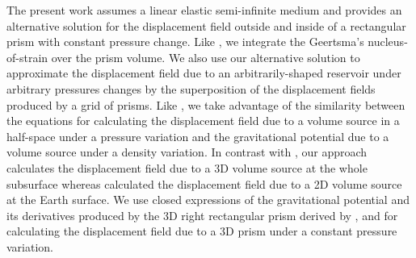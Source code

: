 \documentclass[P]{BrJG_submit}
\begin{document}
The present work assumes a linear elastic semi-infinite medium and provides an alternative solution for the displacement field outside and inside of a rectangular prism with constant pressure change.
Like \cite{Munoz-Roehl17}, we integrate the Geertsma's nucleus-of-strain over the prism volume. 
We also use our alternative solution to approximate the displacement field due to an arbitrarily-shaped
reservoir under arbitrary pressures changes by the superposition of the displacement fields produced by
a grid of prisms.
Like \cite{Vasco1987}, we take advantage of the similarity between the  equations for calculating the displacement field due to a volume source in a half-space under a pressure variation and the gravitational potential due to a volume source under a density variation.
In contrast with \cite{Vasco1987}, our approach calculates the displacement field due to a 3D volume source
at the whole subsurface whereas \cite{Vasco1987} calculated the displacement field due to a 2D volume source
at the Earth surface.
We use closed expressions of the gravitational potential and its derivatives produced by the 3D right rectangular prism derived by \cite{Nagyetal2000}, \cite{Nagyetal2002}  and \cite{Fukushima2020}  for calculating the displacement field due to a 3D prism
under a constant pressure variation.
\end{document}
